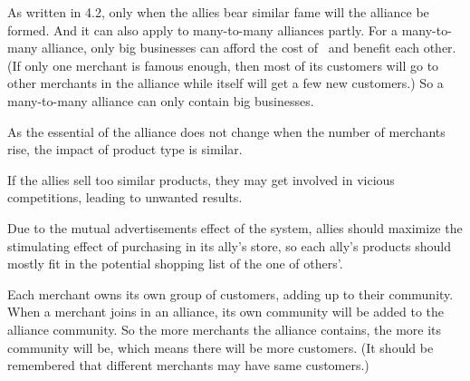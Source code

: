 \begin{enumerate}
	
	As written in 4.2, only when the allies bear similar fame will the alliance be formed. And it can also apply to many-to-many alliances partly. For a many-to-many alliance, only big businesses can afford the cost of \RPd\ and benefit each other. (If only one merchant is famous enough, then most of its customers will go to other merchants in the alliance while itself will get a few new customers.) So a many-to-many alliance can only contain big businesses.
	
	
	As the essential of the alliance does not change when the number of merchants rise, the impact of product type is similar.
	
	\begin{enumerate}
		
		If the allies sell too similar products, they may get involved in vicious competitions, leading to unwanted results.
		
		
		Due to the mutual advertisements effect of the system, allies should maximize the stimulating effect of purchasing in its ally's store, so each ally's products should mostly fit in the potential shopping list of the one of others'.
	\end{enumerate}
	
	
	Each merchant owns its own group of customers, adding up to their community. When a merchant joins in an alliance, its own community will be added to the alliance community. So the more merchants the alliance contains, the more its community will be, which means there will be more customers. (It should be remembered that different merchants may have same customers.)

\end{enumerate}
